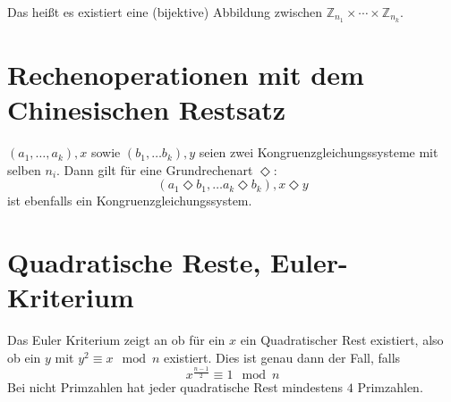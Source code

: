 Das heißt es existiert eine (bijektive) Abbildung zwischen $\mathbb{Z}_{n_1} \times \cdots \times \mathbb{Z}_{n_k}$.

\section{Rechenoperationen mit dem Chinesischen Restsatz}
$(a_1, \ldots, a_k), x$ sowie $(b_1, \ldots b_k), y$ seien zwei Kongruenzgleichungssysteme
mit selben $n_i$.
Dann gilt für eine Grundrechenart $\Diamond$:
\begin{equation}
    (a_1 \Diamond b_1, \ldots a_k \Diamond b_k), x \Diamond y
\end{equation}
ist ebenfalls ein Kongruenzgleichungssystem.

\section{Quadratische Reste, Euler-Kriterium}
Das Euler Kriterium zeigt an ob für ein $x$ ein Quadratischer Rest existiert, also ob ein
$y$ mit $y^2 \equiv x \mod n$ existiert. 
Dies ist genau dann der Fall, falls
\begin{equation}
    x^{\frac{n-1}{2}} \equiv 1 \mod n
\end{equation}
Bei nicht Primzahlen hat jeder quadratische Rest mindestens $4$ Primzahlen.

